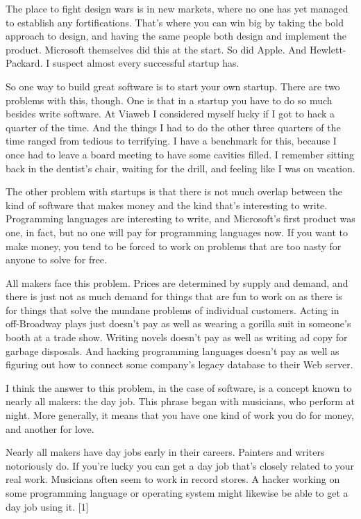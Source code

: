 The place to fight design wars is in new markets, where no one has yet
managed to establish any fortifications. That's where you can win big by
taking the bold approach to design, and having the same people both
design and implement the product. Microsoft themselves did this at the
start. So did Apple. And Hewlett-Packard. I suspect almost every
successful startup has.

So one way to build great software is to start your own startup. There
are two problems with this, though. One is that in a startup you have to
do so much besides write software. At Viaweb I considered myself lucky
if I got to hack a quarter of the time. And the things I had to do the
other three quarters of the time ranged from tedious to terrifying. I
have a benchmark for this, because I once had to leave a board meeting
to have some cavities filled. I remember sitting back in the dentist's
chair, waiting for the drill, and feeling like I was on vacation.

The other problem with startups is that there is not much overlap
between the kind of software that makes money and the kind that's
interesting to write. Programming languages are interesting to write,
and Microsoft's first product was one, in fact, but no one will pay for
programming languages now. If you want to make money, you tend to be
forced to work on problems that are too nasty for anyone to solve for
free.

All makers face this problem. Prices are determined by supply and
demand, and there is just not as much demand for things that are fun to
work on as there is for things that solve the mundane problems of
individual customers. Acting in off-Broadway plays just doesn't pay as
well as wearing a gorilla suit in someone's booth at a trade show.
Writing novels doesn't pay as well as writing ad copy for garbage
disposals. And hacking programming languages doesn't pay as well as
figuring out how to connect some company's legacy database to their Web
server.

I think the answer to this problem, in the case of software, is a
concept known to nearly all makers: the day job. This phrase began with
musicians, who perform at night. More generally, it means that you have
one kind of work you do for money, and another for love.

Nearly all makers have day jobs early in their careers. Painters and
writers notoriously do. If you're lucky you can get a day job that's
closely related to your real work. Musicians often seem to work in
record stores. A hacker working on some programming language or
operating system might likewise be able to get a day job using it.
{[}1{]}

